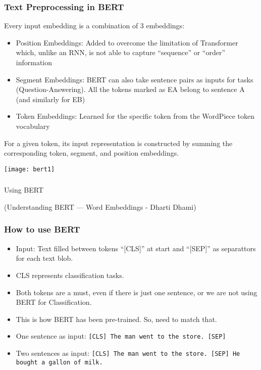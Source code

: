 \begin{frame}[fragile]\frametitle{Text Preprocessing in BERT}

Every input embedding is a combination of 3 embeddings:

\begin{itemize}
\item Position Embeddings: Added to overcome the limitation of Transformer which, unlike an RNN, is not able to capture ``sequence'' or ``order'' information
\item Segment Embeddings: BERT can also take sentence pairs as inputs for tasks (Question-Answering). All the tokens marked as EA belong to sentence A (and similarly for EB)
\item Token Embeddings:  Learned for the specific token from the WordPiece token vocabulary
\end{itemize}

For a given token, its input representation is constructed by summing the corresponding token, segment, and position embeddings.

\begin{center}
\texttt{[image: bert1]}
\end{center}

\end{frame}

\begin{frame}[fragile]\frametitle{}

\begin{center}
{\Large Using BERT}

{\tiny (Understanding BERT — Word Embeddings - Dharti Dhami)}

\end{center}
\end{frame}



\begin{frame}[fragile]\frametitle{How to use BERT}
\begin{itemize}
\item Input: Text filled between tokens ``[CLS]'' at start and ``[SEP]'' as separattors for each text blob. 
\item CLS represents classification tasks. 
\item Both tokens are a must, even if there is just one sentence, or we are not using BERT for Classification.
\item This is how BERT has been pre-trained. So, need to match that.
\item One sentence as input: \lstinline|[CLS] The man went to the store. [SEP]|
\item Two sentences as input: \lstinline|[CLS] The man went to the store. [SEP] He bought a gallon of milk.|
\end{itemize}
\end{frame}

